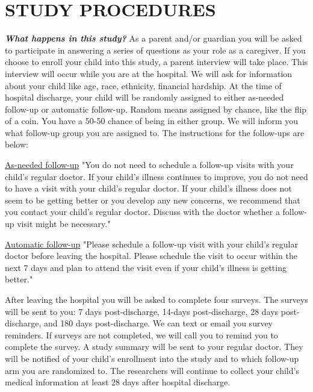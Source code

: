 \documentclass[11pt]{article}
\begin{document}
%
{%
\section{STUDY PROCEDURES}
\label{sec:studyprocedures}
{  \textbf{\textit{What happens in this study?}} 
As a parent and/or guardian you will be asked to participate in answering a series of questions as your role as a caregiver. If you choose to enroll your child into this study, a parent interview will take place. This interview will occur while you are at the hospital.  We will ask for information about your child like age, race, ethnicity, financial hardship.
At the time of hospital discharge, your child will be randomly assigned to either as-needed follow-up or automatic follow-up. Random means assigned by chance, like the flip of a coin. You have a 50-50 chance of being in either group.  We will inform you what follow-up group you are assigned to. 
The instructions for the follow-ups are below:
 
\begin{compactitem}
\item\uline{As-needed follow-up} "You do not need to schedule a follow-up visits with your child's regular doctor. If your child's illness continues to improve, you do not need to have a visit with your child's regular doctor. If your child's illness does not seem to be getting better or you develop any new concerns, we recommend that you contact your child's regular doctor. Discuss with the doctor whether a follow-up visit might be necessary."
\item\uline{Automatic follow-up} "Please schedule a follow-up visit with your child's regular doctor before leaving the hospital. Please schedule the visit to occur within the next 7 days and plan to attend the visit even if your child's illness is getting better."
\end{compactitem}

After leaving the hospital you will be asked to complete four surveys.  The surveys will be sent to you: 7 days post-discharge, 14-days post-discharge, 28 days post-discharge, and 180 days post-discharge. We can text or email you survey reminders.  If surveys are not completed, we will call you to remind you to complete the survey.  
A study summary will be sent to your regular doctor. They will be notified of your child's enrollment into the study and to which follow-up arm you are randomized to. 
The researchers will continue to collect your child's medical information at least 28 days after hospital discharge.}
}%
{}%
\end{document}
